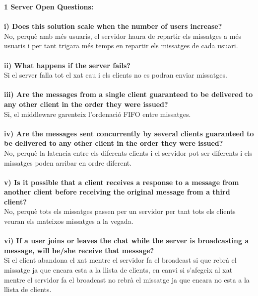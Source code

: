 \documentclass[a4paper, 10pt]{article}
\begin{document}
\begin{itemize}



\textbf{1 Server Open Questions:}\\
\\
\textbf{i) Does  this  solution  scale  when  the  number  of  users
increase?\\}No, perqu\`e amb m\'es usuaris, el servidor haura de repartir els missatges a m\'es usuaris i per tant trigara m\'es temps en repartir els missatges de cada usuari.\\
\\
\textbf{ii) What happens if the server fails?\\} Si el server falla tot el xat cau i els clients no es podran enviar missatges.\\
\\
\textbf{iii) Are  the  messages  from  a
single client guaranteed to be delivered to any other client in the order they were
issued? \\} Si, el middleware garenteix l'ordenaci\'o  FIFO entre missatges.\\ 
\\
\textbf{iv) Are the messages sent concurrently by several clients guaranteed to be delivered
to any other client in the order they were issued?\\} No, perqu\`e la latencia entre els diferents clients i el servidor pot ser diferents i els missatges poden arribar en ordre diferent.\\
\\
\textbf{v) Is it possible that a client
receives a response to a message from another client before receiving the original
message from a third client?\\} No, perqu\`e tots els missatges passen per un servidor per tant tots els clients veuran els mateixos missatges a la vegada.\\
\\
\textbf{vi) If a user joins or leaves the chat while the server
is broadcasting a message, will he/she receive that message?\\} Si el client abandona el xat mentre el servidor fa el broadcast si que rebr\`a el missatge ja que encara esta a la llista de clients, en canvi si s'afegeix al xat mentre el servidor fa el broadcast no rebrà el missatge ja que encara no esta a la  llista de clients.\\
\\

\newpage


\end{itemize}
\end{document}
